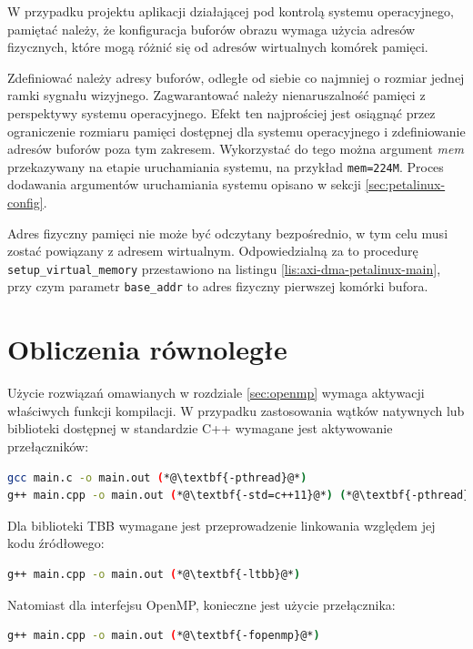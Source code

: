 W przypadku projektu aplikacji działającej pod kontrolą systemu operacyjnego, pamiętać należy, że konfiguracja buforów obrazu wymaga użycia adresów fizycznych, które mogą różnić się od adresów wirtualnych komórek pamięci.

Zdefiniować należy adresy buforów, odległe od siebie co najmniej o rozmiar jednej ramki sygnału wizyjnego. 
Zagwarantować należy nienaruszalność pamięci z perspektywy systemu operacyjnego. 
Efekt ten najprościej jest osiągnąć przez ograniczenie rozmiaru pamięci dostępnej dla systemu operacyjnego i zdefiniowanie adresów buforów poza tym zakresem. 
Wykorzystać do tego można argument \textit{mem} przekazywany na etapie uruchamiania systemu, na przykład \texttt{mem=224M}. 
Proces dodawania argumentów uruchamiania systemu opisano w sekcji \ref{sec:petalinux-config}. %

Adres fizyczny pamięci nie może być odczytany bezpośrednio, w tym celu musi zostać powiązany z adresem wirtualnym. 
Odpowiedzialną za to procedurę \texttt{setup\_virtual\_memory} przestawiono na listingu \ref{lis:axi-dma-petalinux-main}, przy czym parametr \texttt{base\_addr} to adres fizyczny pierwszej komórki bufora. 

\section{Obliczenia równoległe}
\label{sec:multithreading-config}
Użycie rozwiązań omawianych w rozdziale \ref{sec:openmp} wymaga aktywacji właściwych funkcji kompilacji.
W przypadku zastosowania wątków natywnych lub biblioteki dostępnej w standardzie C++ wymagane jest aktywowanie przełączników: %

\begin{lstlisting}[language=bash]
gcc main.c -o main.out (*@\textbf{-pthread}@*)
g++ main.cpp -o main.out (*@\textbf{-std=c++11}@*) (*@\textbf{-pthread}@*)
\end{lstlisting}

Dla biblioteki TBB wymagane jest przeprowadzenie linkowania względem jej kodu źródłowego:

\begin{lstlisting}[language=bash]
g++ main.cpp -o main.out (*@\textbf{-ltbb}@*)
\end{lstlisting}

Natomiast dla interfejsu OpenMP, konieczne jest użycie przełącznika:

\begin{lstlisting}[language=bash]
g++ main.cpp -o main.out (*@\textbf{-fopenmp}@*)
\end{lstlisting}

